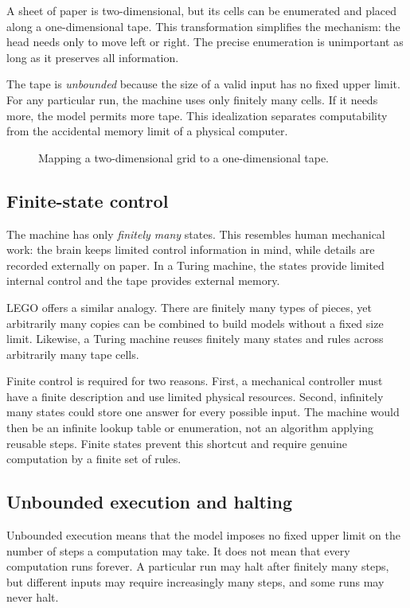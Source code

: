 \documentclass[11pt]{article}
\begin{document}
A sheet of paper is two-dimensional, but its cells can be enumerated and placed along a one-dimensional tape. This transformation simplifies the mechanism: the head needs only to move left or right. The precise enumeration is unimportant as long as it preserves all information.

The tape is \emph{unbounded} because the size of a valid input has no fixed upper limit. For any particular run, the machine uses only finitely many cells. If it needs more, the model permits more tape. This idealization separates computability from the accidental memory limit of a physical computer.

\begin{figure}[htbp]
  \centering
  
  \caption{Mapping a two-dimensional grid to a one-dimensional tape.}
  \label{fig:two-dimensional-to-one-dimensional-tape}
\end{figure}

\subsection{Finite-state control}

The machine has only \emph{finitely many} states. This resembles human mechanical
work: the brain keeps limited control information in mind, while details are
recorded externally on paper. In a Turing machine, the states provide limited
internal control and the tape provides external memory.

LEGO offers a similar analogy. There are finitely many types of pieces, yet
arbitrarily many copies can be combined to build models without a fixed size
limit. Likewise, a Turing machine reuses finitely many states and rules across
arbitrarily many tape cells.

Finite control is required for two reasons. First, a mechanical controller must
have a finite description and use limited physical resources. Second, infinitely
many states could store one answer for every possible input. The machine would
then be an infinite lookup table or enumeration, not an algorithm applying
reusable steps. Finite states prevent this shortcut and require genuine
computation by a finite set of rules.

\subsection{Unbounded execution and halting}

Unbounded execution means that the model imposes no fixed upper limit on the
number of steps a computation may take. It does not mean that every computation
runs forever. A particular run may halt after finitely many steps, but different
inputs may require increasingly many steps, and some runs may never halt.
\end{document}
